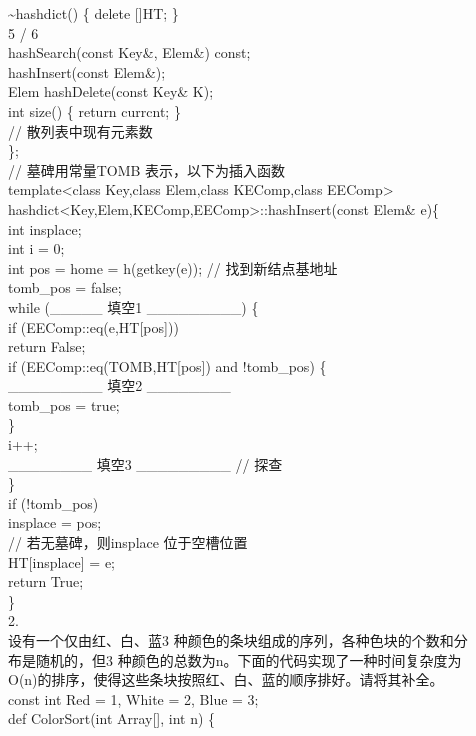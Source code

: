 \begin{question}
\textasciitilde{}hashdict() \{ delete []HT; \}\\
5 / 6\\
hashSearch(const Key\&, Elem\&) const;\\
hashInsert(const Elem\&);\\
Elem hashDelete(const Key\& K);\\
int size() \{ return currcnt; \}\\
// 散列表中现有元素数\\
\};\\
// 墓碑用常量TOMB 表示，以下为插入函数\\
template<class Key,class Elem,class KEComp,class EEComp>\\
hashdict<Key,Elem,KEComp,EEComp>::hashInsert(const Elem\& e)\{\\
int insplace;\\
int i = 0;\\
int pos  = home = h(getkey(e));   // 找到新结点基地址\\
tomb\_pos = false;\\
while (\_\_\_\_\_ 填空1 \_\_\_\_\_\_\_\_\_)  \{\\
if (EEComp::eq(e,HT[pos]))\\
return False;\\
if (EEComp::eq(TOMB,HT[pos]) and !tomb\_pos) \{\\
\_\_\_\_\_\_\_\_\_ 填空2 \_\_\_\_\_\_\_\_\\
tomb\_pos = true;\\
\}\\
i++;\\
\_\_\_\_\_\_\_\_ 填空3 \_\_\_\_\_\_\_\_\_  // 探查\\
\}\\
if (!tomb\_pos)\\
insplace = pos;\\
// 若无墓碑，则insplace 位于空槽位置\\
HT[insplace] = e;\\
return True;\\
\}\\
2.\\
设有一个仅由红、白、蓝3 种颜色的条块组成的序列，各种色块的个数和分\\
布是随机的，但3 种颜色的总数为n。下面的代码实现了一种时间复杂度为\\
O(n)的排序，使得这些条块按照红、白、蓝的顺序排好。请将其补全。\\
const int Red = 1, White = 2, Blue = 3;\\
def ColorSort(int Array[], int n) \{\\

\end{question}
